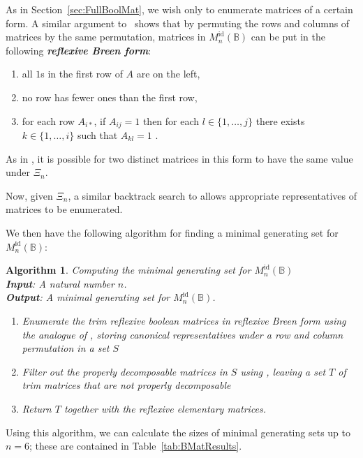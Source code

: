 \documentclass[11pt]{article}
\newtheorem{algo}[thm]{Algorithm}
\newenvironment{alg}{\begin{algo}\rm}{\end{algo}}
\newcommand{\defn}[1]{\textbf{\textit{#1}}}
\numberwithin{equation}{section}
\newcommand{\B}{\mathbb{B}}
\newcommand{\Refln}{M_n^{\text{id}}(\B)}
\begin{document}
As in Section~\ref{sec:FullBoolMat}, we wish only to enumerate matrices of a
certain form. A similar argument to~\cite[Proposition~3.6]{Breen1997aa} shows
that by permuting the rows and columns of matrices by the same permutation,
matrices in $\Refln$ can be put in the following \defn{reflexive Breen form}:

\begin{enumerate}[label={\rm (\roman*)}]
  \item{all $1$s in the first row of $A$ are on the left,}
  \item{no row has fewer ones than the first row,}
  \item{for each row $A_{i*}$, if $A_{ij} = 1$ then for each $l \in \{1, \ldots,
        j\}$ there exists $k \in \{1, \ldots, i\}$ such that $A_{kl} = 1$ .}
\end{enumerate}

As in , it is possible for two distinct matrices
in this form to have the same value under $\Xi_n$.

Now, given $\Xi_n$, a similar backtrack search to 
allows appropriate representatives of matrices to be enumerated.

We then have the following algorithm for finding a minimal generating set for
$\Refln$:
\begin{alg}
  Computing the minimal generating set for $\Refln$ \\
  \textbf{Input}: A natural number $n$.\\
  \textbf{Output}: A minimal generating set for $\Refln$.
\begin{enumerate}
  \item
    Enumerate the trim reflexive boolean matrices in reflexive Breen form using
    the analogue of , storing canonical
    representatives under a row and column permutation in a set $S$
  \item 
    Filter out the properly decomposable matrices in $S$ using
    , leaving a set $T$ of trim matrices that
    are not properly decomposable
  \item
    Return $T$ together with the reflexive elementary matrices.
\end{enumerate}
\end{alg}
Using this algorithm, we can calculate the sizes of minimal generating sets up
to $n = 6$; these are contained in Table~\ref{tab:BMatResults}.
\end{document}
